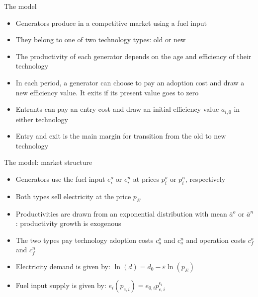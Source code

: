 \documentclass{beamer}
\begin{document}
\begin{frame}{The model}

\begin{itemize}
 \item Generators produce in a competitive market using a fuel input
 \item They belong to one of two technology types: old or new
 \item The productivity of each generator depends on the age and efficiency of their technology
 \item In each period, a generator can choose to pay an adoption cost and draw a new efficiency value. It exits if its present value goes to zero
 \item Entrants can pay an entry cost and draw an initial efficiency value $a_{i,0}$ in either technology
 \item Entry and exit is the main margin for transition from the old to new technology
\end{itemize}
    
\end{frame}
\begin{frame}{The model: market structure}
\begin{itemize}
 \item Generators use the fuel input $e_i^o$ or $e_i^n$ at prices $p_i^o$ or $p_i^n$, respectively
  \item Both types sell electricity at the price $p_E$
 \item Productivities are drawn from an exponential distribution with mean $\overline{a}^o$ or $\overline{a}^n$: productivity growth is exogenous
 \item The two types pay technology adoption costs $c_a^o$ and $c_a^n$ and operation costs $c_f^o$ and $c_f^n$
 \hfill \break
 \item Electricity demand is given by: $\ln(d) = d_0-\varepsilon\ln(p_E)$
 \item Fuel input supply is given by:  $e_i(p_{e,i}) = e_{0,i}p_{e,i}^{\epsilon_{i}}$

\end{itemize}
    
\end{frame}
\end{document}
